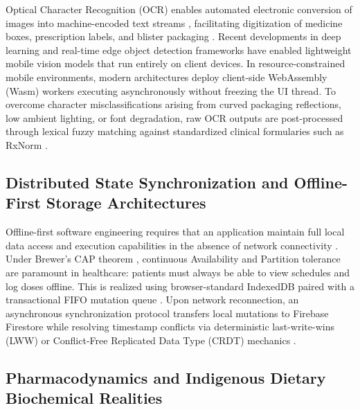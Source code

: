 Optical Character Recognition (OCR) enables automated electronic conversion of images into machine-encoded text streams \cite{smith2007tesseract}, facilitating digitization of medicine boxes, prescription labels, and blister packaging \cite{dayer2013smartphone}. Recent developments in deep learning \cite{lecun2015deep} and real-time edge object detection frameworks \cite{redmon2016yolo} have enabled lightweight mobile vision models that run entirely on client devices. In resource-constrained mobile environments, modern architectures deploy client-side WebAssembly (Wasm) workers executing asynchronously without freezing the UI thread. To overcome character misclassifications arising from curved packaging reflections, low ambient lighting, or font degradation, raw OCR outputs are post-processed through lexical fuzzy matching against standardized clinical formularies such as RxNorm \cite{rxnorm2024}.

\subsection{Distributed State Synchronization and Offline-First Storage Architectures}

Offline-first software engineering requires that an application maintain full local data access and execution capabilities in the absence of network connectivity \cite{kleppmann2017designing}. Under Brewer's CAP theorem \cite{brewer2000cap}, continuous Availability and Partition tolerance are paramount in healthcare: patients must always be able to view schedules and log doses offline. This is realized using browser-standard IndexedDB paired with a transactional FIFO mutation queue \cite{kleppmann2017designing}. Upon network reconnection, an asynchronous synchronization protocol transfers local mutations to Firebase Firestore while resolving timestamp conflicts via deterministic last-write-wins (LWW) or Conflict-Free Replicated Data Type (CRDT) mechanics \cite{shapiro2011crdt}.

\subsection{Pharmacodynamics and Indigenous Dietary Biochemical Realities}

